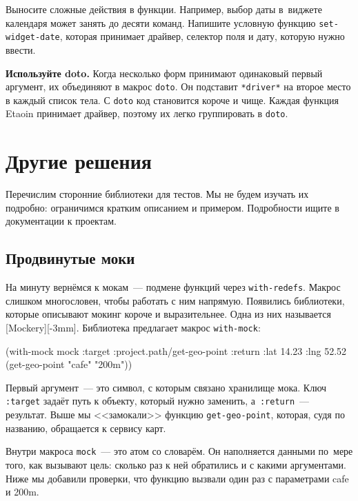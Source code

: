 \fi

Выносите сложные действия в функции. Например, выбор даты в~виджете календаря
может занять до десяти команд. Напишите условную функцию
\verb|set-widget-date|, которая принимает драйвер, селектор поля и дату,
которую нужно ввести.


\textbf{Используйте doto.} Когда несколько форм принимают одинаковый первый
аргумент, их объединяют в макрос \verb|doto|. Он подставит \verb|*driver*| на
второе место в каждый список тела. С \verb|doto| код становится короче и
чище. Каждая функция Etaoin принимает драйвер, поэтому их легко группировать в
\verb|doto|.

\section{Другие решения}

Перечислим сторонние библиотеки для тестов. Мы не будем изучать их подробно:
ограничимся кратким описанием и примером. Подробности ищите в документации к
проектам.

\subsection{Продвинутые моки}


На минуту вернёмся к мокам~--- подмене функций через \verb|with-redefs|. Макрос
слишком многословен, чтобы работать с ним напрямую. Появились библиотеки,
которые описывают мокинг короче и выразительнее. Одна из них называется
[Mockery][-3mm].
Библиотека предлагает макрос \verb|with-mock|:

\begin{english}
  \begin{clojure}
(with-mock mock
  {:target :project.path/get-geo-point
   :return {:lat 14.23 :lng 52.52}}
  (get-geo-point "cafe" "200m"))
  \end{clojure}
\end{english}

Первый аргумент~--- это символ, с которым связано хранилище мока. Ключ \verb|:target|
задаёт путь к объекту, который нужно заменить, а~\verb|:return|~---
результат. Выше мы <<замокали>> функцию \verb|get-geo-point|, которая, судя по
названию, обращается к сервису карт.

Внутри макроса \verb|mock|~--- это атом со словарём. Он наполняется данными по~мере
того, как вызывают цель: сколько раз к ней обратились и с какими
аргументами. Ниже мы добавили проверки, что функцию вызвали один раз с
параметрами cafe и 200m.

